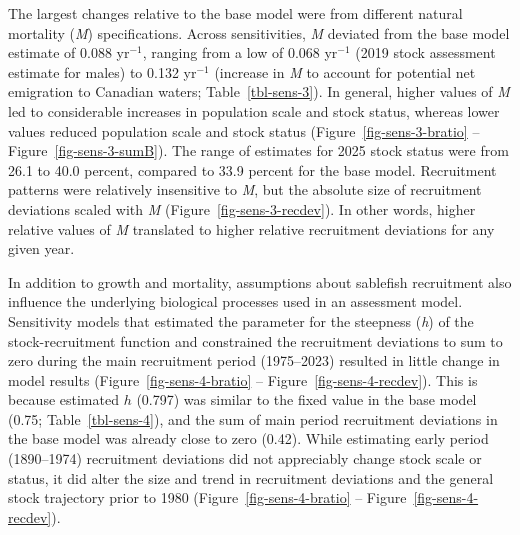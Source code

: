 \documentclass[
  english,
]{article}
\begin{document}
The largest changes relative to the base model were from different
natural mortality (\emph{M}) specifications. Across sensitivities,
\emph{M} deviated from the base model estimate of 0.088 yr\(^{-1}\),
ranging from a low of 0.068 yr\(^{-1}\) (2019 stock assessment estimate
for males) to 0.132 yr\(^{-1}\) (increase in \emph{M} to account for
potential net emigration to Canadian waters; Table~\ref{tbl-sens-3}). In
general, higher values of \emph{M} led to considerable increases in
population scale and stock status, whereas lower values reduced
population scale and stock status (Figure~\ref{fig-sens-3-bratio} --
Figure~\ref{fig-sens-3-sumB}). The range of estimates for 2025 stock
status were from 26.1 to 40.0 percent, compared to 33.9 percent for the
base model. Recruitment patterns were relatively insensitive to
\emph{M}, but the absolute size of recruitment deviations scaled with
\emph{M} (Figure~\ref{fig-sens-3-recdev}). In other words, higher
relative values of \emph{M} translated to higher relative recruitment
deviations for any given year.

In addition to growth and mortality, assumptions about sablefish
recruitment also influence the underlying biological processes used in
an assessment model. Sensitivity models that estimated the parameter for
the steepness (\emph{h}) of the stock-recruitment function and
constrained the recruitment deviations to sum to zero during the main
recruitment period (1975--2023) resulted in little change in model
results (Figure~\ref{fig-sens-4-bratio} --
Figure~\ref{fig-sens-4-recdev}). This is because estimated \(h\) (0.797)
was similar to the fixed value in the base model (0.75;
Table~\ref{tbl-sens-4}), and the sum of main period recruitment
deviations in the base model was already close to zero (0.42). While
estimating early period (1890--1974) recruitment deviations did not
appreciably change stock scale or status, it did alter the size and
trend in recruitment deviations and the general stock trajectory prior
to 1980 (Figure~\ref{fig-sens-4-bratio} --
Figure~\ref{fig-sens-4-recdev}).
\end{document}
